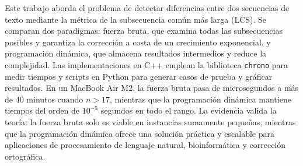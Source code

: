 Este trabajo aborda el problema de detectar diferencias entre dos secuencias de texto mediante la métrica de la subsecuencia común más larga (LCS). Se comparan dos paradigmas: fuerza bruta, que examina todas las subsecuencias posibles y garantiza la corrección a costa de un crecimiento exponencial, y programación dinámica, que almacena resultados intermedios y reduce la complejidad. Las implementaciones en C++ emplean la biblioteca \texttt{chrono} para medir tiempos y scripts en Python para generar casos de prueba y gráficar resultados. En un MacBook Air M2, la fuerza bruta pasa de microsegundos a más de 40 minutos cuando $n>17$, mientras que la programación dinámica mantiene tiempos del orden de $10^{-5}$ segundos en todo el rango. La evidencia valida la teoría: la fuerza bruta solo es viable en instancias sumamente pequeñas, mientras que la programación dinámica ofrece una solución práctica y escalable para aplicaciones de procesamiento de lenguaje natural, bioinformática y corrección ortográfica.